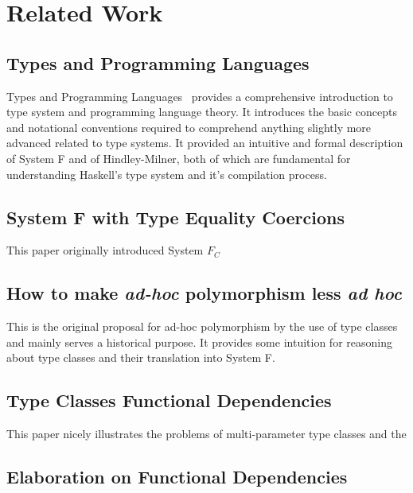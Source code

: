 \section{Related Work}


\subsection{Types and Programming Languages}

Types and Programming Languages~\cite{pierce2002types} provides a comprehensive introduction to type system and programming
language theory. It introduces the basic concepts and notational conventions
required to comprehend anything slightly more advanced related to type systems.
It provided an intuitive and formal description of System F and of
Hindley-Milner, both of which are fundamental for understanding Haskell's type
system and it's compilation process.
\subsection{System F with Type Equality
Coercions\cite{Sulzmann:2007:SFT:1190315.1190324}}

This paper originally introduced System $F_C$

\subsection{How to make \textit{ad-hoc} polymorphism less \textit{ad
hoc}\cite{Wadler:1989:MAP:75277.75283}}

This is the original proposal for ad-hoc polymorphism by the use of type classes
and mainly serves a historical purpose. It provides some intuition for reasoning
about type classes and their translation into System F.

\subsection{Type Classes Functional Dependencies\cite{Jones00typeclasses}}
This paper nicely illustrates the problems of multi-parameter type classes and
the 
\subsection{Elaboration on Functional
Dependencies\cite{Karachalias:2017:EFD:3156695.3122966}}

